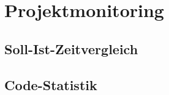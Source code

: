 \chapter{Projektmonitoring}
\label{pm-projektmonitoring}

\section{Soll-Ist-Zeitvergleich}


\section{Code-Statistik}